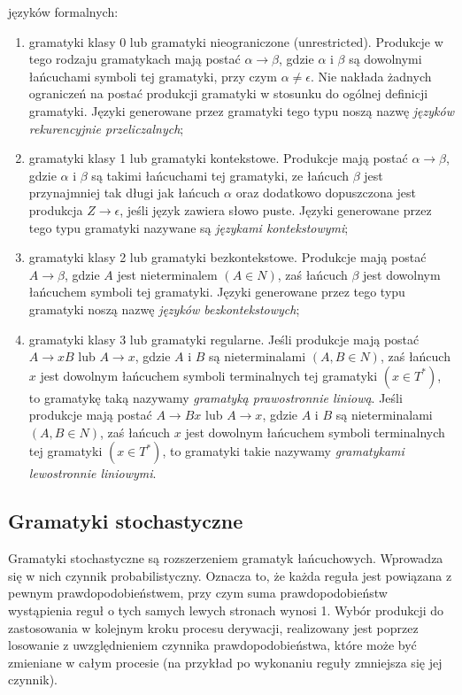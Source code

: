 języków formalnych:
 \begin{enumerate}
  \item gramatyki klasy 0 lub gramatyki nieograniczone (unrestricted). Produkcje
  w tego rodzaju gramatykach mają postać $\alpha\longrightarrow\beta$, gdzie
  $\alpha$ i $\beta$ są dowolnymi łańcuchami symboli tej gramatyki, przy czym
  $\alpha\neq\epsilon$. Nie nakłada żadnych ograniczeń na postać produkcji
  gramatyki w stosunku do ogólnej definicji gramatyki. Języki generowane przez
  gramatyki tego typu noszą nazwę {\em języków rekurencyjnie przeliczalnych};
  \item gramatyki klasy 1 lub gramatyki kontekstowe. Produkcje mają postać
  $\alpha\longrightarrow\beta$, gdzie $\alpha$ i $\beta$ są takimi łańcuchami
  tej gramatyki, ze łańcuch $\beta$ jest przynajmniej tak długi jak łańcuch
  $\alpha$ oraz dodatkowo dopuszczona jest produkcja $Z\longrightarrow\epsilon$,
  jeśli język zawiera słowo puste. Języki generowane przez tego typu gramatyki
  nazywane są {\em językami kontekstowymi};
  \item gramatyki klasy 2 lub gramatyki bezkontekstowe. Produkcje mają postać
  $A\longrightarrow\beta$, gdzie $A$ jest nieterminalem $(A\in N)$, zaś łańcuch
  $\beta$ jest dowolnym łańcuchem symboli tej gramatyki. Języki generowane przez
  tego typu gramatyki noszą nazwę {\em języków bezkontekstowych};
  \item gramatyki klasy 3 lub gramatyki regularne. Jeśli produkcje mają postać
  $A\longrightarrow xB$ lub $A\longrightarrow x$, gdzie $A$ i $B$ są
  nieterminalami $(A,B\in N)$, zaś łańcuch $x$ jest dowolnym łańcuchem symboli
  terminalnych tej gramatyki $(x\in T^*)$, to gramatykę taką nazywamy {\em
  gramatyką prawostronnie liniową}. Jeśli produkcje mają postać
  $A\longrightarrow Bx$ lub $A\longrightarrow x$, gdzie $A$ i $B$ są
  nieterminalami $(A,B\in N)$, zaś łańcuch $x$ jest dowolnym łańcuchem symboli
  terminalnych tej gramatyki $(x\in T^*)$, to gramatyki takie nazywamy {\em
  gramatykami lewostronnie liniowymi}.
\end{enumerate}
\subsection{Gramatyki stochastyczne}
Gramatyki stochastyczne są rozszerzeniem gramatyk łańcuchowych. Wprowadza się w
nich czynnik probabilistyczny. Oznacza to, że każda reguła jest powiązana z
pewnym prawdopodobieństwem, przy czym suma prawdopodobieństw wystąpienia reguł o
tych samych lewych stronach wynosi 1. Wybór produkcji do zastosowania w kolejnym
kroku procesu derywacji, realizowany jest poprzez losowanie z uwzględnieniem
czynnika prawdopodobieństwa, które może być zmieniane w całym procesie (na
przykład po wykonaniu reguły zmniejsza się jej czynnik).

